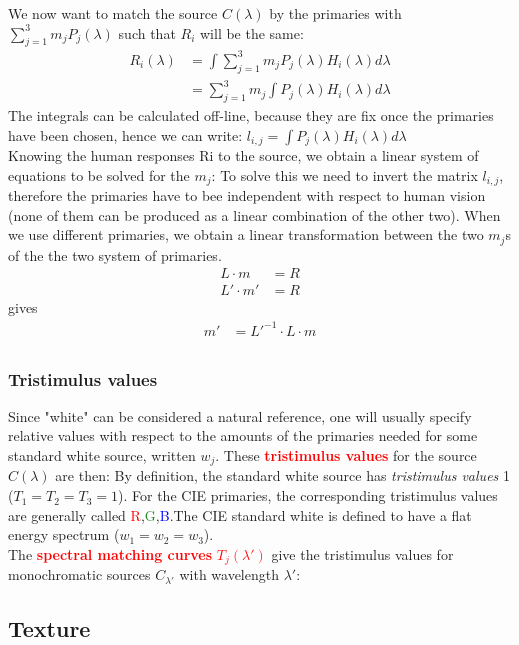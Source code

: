 \documentclass[a4paper, fontsize=8pt, landscape, DIV=1]{scrartcl}
\begin{document}
\begin{multicols*}{4}
		We now want to match the source $C(\lambda)$ by the primaries with $\sum_{j=1}^{3}m_jP_j(\lambda)$ such that $R_i$ will be the same:
		\begin{align*}
			R_i(\lambda)&=\int\sum_{j=1}^{3}m_jP_j(\lambda)H_i(\lambda)d\lambda\\
						&=\sum_{j=1}^{3}m_j\int P_j(\lambda)H_i(\lambda)d\lambda
		\end{align*}
		The integrals can be calculated off-line, because they are fix once the primaries have been chosen, hence we can write: \hspace{0.2cm}$l_{i,j}=\int P_j(\lambda)H_i(\lambda)d\lambda$\\
		Knowing the human responses Ri to the source, we obtain a linear system of equations to be solved for the $m_j$:
		To solve this we need to invert the matrix $l_{i,j}$, therefore the primaries have to bee independent with respect to human vision (none of them can be produced as a linear combination of the other two). When we use different primaries, we obtain a linear transformation between the two $m_j$s of the the two system of primaries.
		\begin{align*}
			L\cdot m&=R\\
			L'\cdot m'&=R
		\end{align*} 
		gives 
		\begin{align*}
			m'&=L'^{-1}\cdot L\cdot m\\
		\end{align*}
		
		\subsubsection{Tristimulus values}
		Since "white" can be considered a natural reference, one will usually specify relative values with respect to the amounts of the primaries needed for some standard white source, written $w_j$. These \textcolor{red}{\textbf{tristimulus values}} for the source $C(\lambda)$ are then: 
		By definition, the standard white source has \textit{tristimulus values} 1 ($T_1 = T_2 = T_3 = 1$). For the CIE primaries, the corresponding tristimulus values are generally called \textcolor{red}{R},\textcolor{ForestGreen}{G},\textcolor{blue}{B}.The CIE standard white is defined to have a flat energy spectrum ($w_1=w_2=w_3$). \\
		The \textcolor{red}{\textbf{spectral matching curves} $T_j(\lambda')$} give the tristimulus values for monochromatic sources $C_{\lambda'}$ with wavelength $\lambda'$:
		
		\subsection{Texture}
		
		
		
	\end{multicols*}
	\setcounter{secnumdepth}{3}
\end{document}
